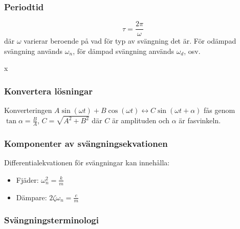 \documentclass{article}
\newenvironment{ankiflashcard}[1]{}{}
\begin{document}
\begin{paracol}{2}
\begin{ankiflashcard}{Definiera periodtiden för svängningar.}
\subsubsection{Periodtid}
$$\tau = \frac{2\pi}{\omega}$$
där $\omega$ varierar beroende på vad för typ av svängning det är. För odämpad svängning används $\omega_n$, för dämpad svängning används $\omega_d$, osv.
\end{ankiflashcard}


\begin{ankiflashcard}{Hur kan man konvertera mellan lösningar för svängningsekvationen?}
x\subsubsection{Konvertera lösningar}
Konverteringen $A\sin(\omega t)+B\cos(\omega t) \leftrightarrow C\sin(\omega t + \alpha)$ fås genom
$\tan \alpha = \frac{B}{A}$, $C=\sqrt{A^2+B^2}$ där $C$ är amplituden och $\alpha$ är fasvinkeln.
\end{ankiflashcard}

\subsubsection{Komponenter av svängningsekvationen}
Differentialekvationen för svängningar kan innehålla:

\begin{ankiflashcard}{Definiera beteckningarna för fjäder och dämpare.}
    
\begin{itemize}
    \item Fjäder: $\omega_n^2 = \frac k m$
    \item Dämpare: $2\zeta \omega_n = \frac c m$
\end{itemize}
\end{ankiflashcard}
\subsubsection{Svängningsterminologi}


\end{paracol}
\end{document}
